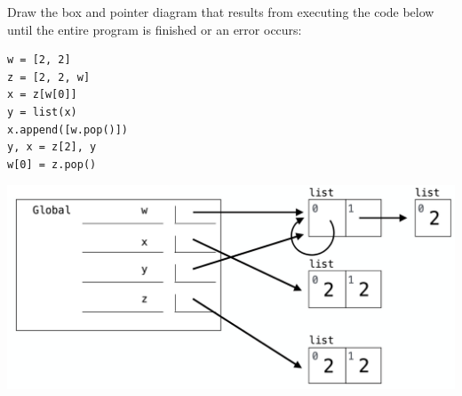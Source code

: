 
\question Draw the box and pointer diagram that results from executing the
code below until the entire program is finished or an error occurs:

\begin{lstlisting}
w = [2, 2]
z = [2, 2, w]
x = z[w[0]]
y = list(x)
x.append([w.pop()])
y, x = z[2], y
w[0] = z.pop()
\end{lstlisting}

\begin{solution}[0.5in]
\begin{center}
\includegraphics[scale=.4]{abcdsol.png}
\end{center}
\end{solution}
